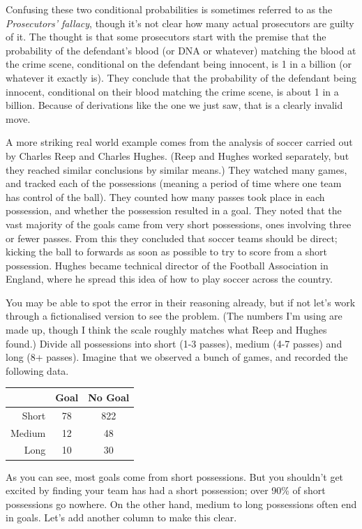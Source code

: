 \documentclass[openany]{book}
\begin{document}
Confusing these two conditional probabilities is sometimes referred to as the \textit{Prosecutors' fallacy}, though it's not clear how many actual prosecutors are guilty of it. The thought is that some prosecutors start with the premise that the probability of the defendant's blood (or DNA or whatever) matching the blood at the crime scene, conditional on the defendant being innocent, is 1 in a billion (or whatever it exactly is). They conclude that the probability of the defendant being innocent, conditional on their blood matching the crime scene, is about 1 in a billion. Because of derivations like the one we just saw, that is a clearly invalid move.

A more striking real world example comes from the analysis of soccer carried out by Charles Reep and Charles Hughes. (Reep and Hughes worked separately, but they reached similar conclusions by similar means.) They watched many games, and tracked each of the possessions (meaning a period of time where one team has control of the ball). They counted how many passes took place in each possession, and whether the possession resulted in a goal. They noted that the vast majority of the goals came from very short possessions, ones involving three or fewer passes. From this they concluded that soccer teams should be direct; kicking the ball to forwards as soon as possible to try to score from a short possession. Hughes became technical director of the Football Association in England, where he spread this idea of how to play soccer across the country.

You may be able to spot the error in their reasoning already, but if not let's work through a fictionalised version to see the problem. (The numbers I'm using are made up, though I think the scale roughly matches what Reep and Hughes found.) Divide all possessions into short (1-3 passes), medium (4-7 passes) and long (8+ passes). Imagine that we observed a bunch of games, and recorded the following data.

\begin{center}
\begin{tabular}{r | c c}
& Goal & No Goal \\ \hline
Short & 78 & 822 \\ %
Medium & 12 & 48 	\\ %
Long & 10 & 30  %
\end{tabular}
\end{center}
As you can see, most goals come from short possessions. But you shouldn't get excited by finding your team has had a short possession; over 90\% of short possessions go nowhere. On the other hand, medium to long possessions often end in goals. Let's add another column to make this clear.
\end{document}
